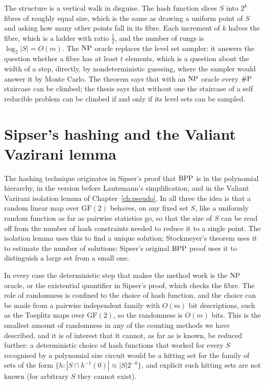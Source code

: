 The structure is a vertical walk in disguise. The hash function slices $S$ into $2^k$ fibres of roughly equal size, which is the same as drawing a uniform point of $S$ and asking how many other points fall in its fibre. Each increment of $k$ halves the fibre, which is a ladder with ratio $\tfrac12$, and the number of rungs is $\log_2 |S| = O(m)$. The $\mathrm{NP}$ oracle replaces the level set sampler: it answers the question whether a fibre has at least $t$ elements, which is a question about the width of a step, directly, by nondeterministic guessing, where the sampler would answer it by Monte Carlo. The theorem says that with an $\mathrm{NP}$ oracle every $\#\mathrm{P}$ staircase can be climbed; the thesis says that without one the staircase of a self reducible problem can be climbed if and only if its level sets can be sampled.

\section{Sipser's hashing and the Valiant Vazirani lemma}

The hashing technique originates in Sipser's proof that $\mathrm{BPP}$ is in the polynomial hierarchy, in the version before Lautemann's simplification, and in the Valiant Vazirani isolation lemma of Chapter~\ref{ch:pseudo}. In all three the idea is that a random linear map over $\mathrm{GF}(2)$ behaves, on any fixed set $S$, like a uniformly random function as far as pairwise statistics go, so that the size of $S$ can be read off from the number of hash constraints needed to reduce it to a single point. The isolation lemma uses this to find a unique solution; Stockmeyer's theorem uses it to estimate the number of solutions; Sipser's original $\mathrm{BPP}$ proof uses it to distinguish a large set from a small one.

In every case the deterministic step that makes the method work is the $\mathrm{NP}$ oracle, or the existential quantifier in Sipser's proof, which checks the fibre. The role of randomness is confined to the choice of hash function, and the choice can be made from a pairwise independent family with $O(m)$ bit descriptions, such as the Toeplitz maps over $\mathrm{GF}(2)$, so the randomness is $O(m)$ bits. This is the smallest amount of randomness in any of the counting methods we have described, and it is of interest that it cannot, as far as is known, be reduced further: a deterministic choice of hash functions that worked for every $S$ recognised by a polynomial size circuit would be a hitting set for the family of sets of the form $\{ h : |S \cap h^{-1}(0)| \approx |S| 2^{-k} \}$, and explicit such hitting sets are not known (for arbitrary $S$ they cannot exist).

